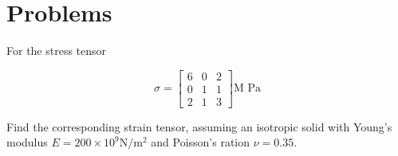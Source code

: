 % 
% 
% 
% 
% 
% 
% 
% 
% 
% 
% 
% 
\section{Problems}

\begin{Exercise}[title={Strain tensor from stress tensor}, label={problem:continuumProblemSet1:q1}]
For the stress tensor

\begin{equation}\label{eqn:continuumProblemSet1:10}
\sigma =
\begin{bmatrix}
6 & 0 & 2 \\
0 & 1 & 1 \\
2 & 1 & 3
\end{bmatrix}
\text{M Pa}
\end{equation}

Find the corresponding strain tensor, assuming an isotropic solid with Young's modulus $E = 200 \times 10^9 \text{N}/\text{m}^2$ and Poisson's ration $\nu = 0.35$.
\end{Exercise}

